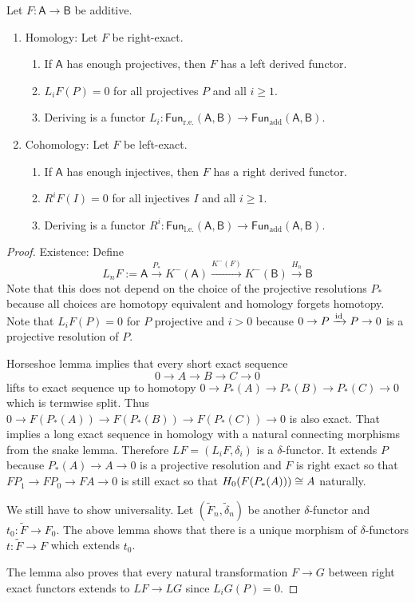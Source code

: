 \documentclass[fontsize=11pt,fleqn,a4paper]{scrartcl}
\begin{document}
\begin{theorem}
Let $F:\mathsf{A}\to\mathsf{B}$ be additive.
\begin{multicols}{2}
\begin{enumerate}
\item Homology: Let $F$ be right-exact.
\begin{enumerate}
\item If $\mathsf{A}$ has enough projectives, then $F$ has a left derived functor.
\item $L_i F(P) = 0$ for all projectives $P$ and all $i \geq 1$.
\item Deriving is a functor $L_i: \mathsf{Fun}_\text{r.e.}(\mathsf{A},\mathsf{B}) \to \mathsf{Fun}_\text{add}(\mathsf{A},\mathsf{B})$.
\end{enumerate}
\item Cohomology: Let $F$ be left-exact.
\begin{enumerate}
\item If $\mathsf{A}$ has enough injectives, then $F$ has a right derived functor.
\item $R^i F(I) = 0$ for all injectives $I$ and all $i \geq 1$.
\item Deriving is a functor $R^i: \mathsf{Fun}_\text{l.e.}(\mathsf{A},\mathsf{B}) \to \mathsf{Fun}_\text{add}(\mathsf{A},\mathsf{B})$.
\end{enumerate}
\end{enumerate}
\end{multicols}
\end{theorem}
\begin{proof}
Existence: Define
\[L_nF := \mathsf{A}\xrightarrow{P_\ast} K^-(\mathsf{A}) \xrightarrow{K^-(F)} K^-(\mathsf{B}) \xrightarrow{H_n} \mathsf{B}\]
Note that this does not depend on the choice of the projective resolutions $P_\ast$ because all choices are homotopy equivalent and homology forgets homotopy. Note that $L_i F(P) = 0$ for $P$ projective and $i>0$ because $0\to P\xrightarrow{\operatorname{id}} P \to 0$ is a projective resolution of $P$.

\medbreak
Horseshoe lemma implies that every short exact sequence
\[0\to A\to B\to C\to 0\]
lifts to exact sequence up to homotopy $0\to P_\ast(A) \to P_\ast(B) \to P_\ast(C)\to 0$ which is termwise split. Thus $0\to F(P_\ast(A)) \to F(P_\ast(B)) \to F(P_\ast(C)) \to 0$ is also exact. That implies a long exact sequence in homology with a natural connecting morphisms from the snake lemma. Therefore $LF=(L_i F,\delta_i)$ is a $\delta$-functor. It extends $P$ because $P_\ast(A)\to A\to 0$ is a projective resolution and $F$ is right exact so that $FP_1 \to FP_0 \to FA \to 0$ is still exact so that $H_0(F(P_\ast(A))) \cong A$ naturally.

\medbreak
We still have to show universality. Let $(\tilde{F}_n,\tilde{\delta}_n)$ be another $\delta$-functor and $t_0: \tilde{F} \to F_0$. The above lemma shows that there is a unique morphism of $\delta$-functors $t: \tilde{F}\to F$ which extends $t_0$.

\medbreak
The lemma also proves that every natural transformation $F\to G$ between right exact functors extends to $LF \to LG$ since $L_iG(P) = 0$.
\end{proof}
\end{document}
